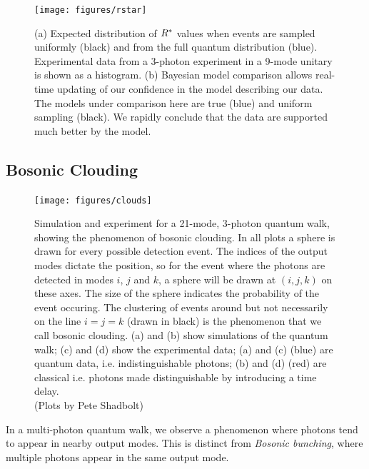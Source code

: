 \begin{figure}
  \centering
  \texttt{[image: figures/rstar]}
  \caption[Using the $\rstar$ discriminator to verify BosonSampling]
  {(a) Expected distribution of \(\rstar\) values when events are sampled
  uniformly (black) and from the full quantum distribution (blue). Experimental
  data from a 3-photon experiment in a 9-mode unitary is shown as a histogram.
  (b) Bayesian model comparison allows real-time updating of our confidence in
  the model describing our data. The models under comparison here are true
  \bosonsampling{} (blue) and uniform sampling (black). We rapidly conclude that
  the data are supported much better by the \bosonsampling{} model.}
\end{figure}

\subsection{Bosonic Clouding}
\label{sec:Clouding}
\begin{figure}
  \centering
  \texttt{[image: figures/clouds]}
  \caption[Bosonic clouding in a quantum walk]
  {Simulation and experiment for a 21-mode, 3-photon quantum walk, showing the
  phenomenon of bosonic clouding. In all plots a sphere is drawn for every
  possible detection event. The indices of the output modes dictate the
  position, so for the event where the photons are detected in modes \(i\),
  \(j\) and \(k\), a sphere will be drawn at \(\left(i,j,k\right)\) on these
  axes. The size of the sphere indicates the probability of the event occuring. 
  The clustering of events around but not necessarily on the line \(i=j=k\)
  (drawn in black) is the phenomenon that we call bosonic clouding.
  (a) and (b) show simulations of the quantum walk; (c) and (d) show the
  experimental data; (a) and (c) (blue) are quantum data, i.e. indistinguishable
  photons; (b) and (d) (red) are classical i.e. photons made distinguishable by
  introducing a time delay.\\
  (Plots by Pete Shadbolt)}
\end{figure}
In a multi-photon quantum walk, we observe a phenomenon where photons tend to
appear in nearby output modes. This is distinct from \emph{Bosonic bunching},
where multiple photons appear in the same output mode.

